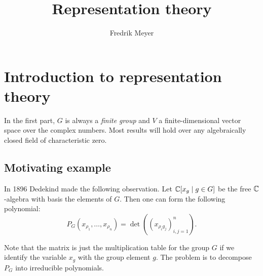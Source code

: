 \documentclass[11pt, english]{article}
\title{Representation theory}
\author{Fredrik Meyer}
\date{}
\begin{document}
\maketitle


\section{Introduction to representation theory}

In the first part, $G$ is always a \emph{finite group} and $V$ a finite-dimensional vector space over the complex numbers. Most results will hold over any algebraically closed field of characteristic zero.

\subsection{Motivating example}

In 1896 Dedekind made the following observation. Let $\mathbb{C}[x_g \mid g \in G]$ be the free $\mathbb{C}$-algebra with basis the elements of $G$. Then one can form the following polynomial:
\[
P_G(x_{\rho_1},\ldots,x_{\rho_n}) = \det \left( (x_{\rho_i g_j})_{i,j=1}^n \right).
\]

Note that the matrix is just the multiplication table for the group $G$ if we identify the variable $x_g$ with the group element $g$. The problem is to decompose $P_G$ into irreducible polynomials. 
\end{document}
